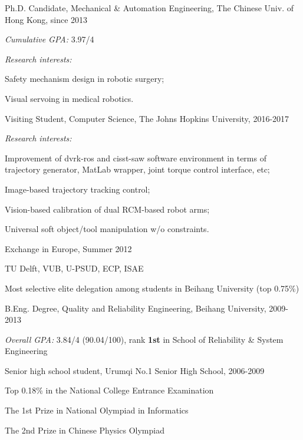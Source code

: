 \documentclass[10pt,letterpaper]{article}
\renewenvironment{itemize}{
\begin{list}{}{
    \setlength{\leftmargin}{1.5em}
    \setlength{\itemsep}{0.25em}
    \setlength{\parskip}{0pt}
    \setlength{\parsep}{0.25em}
    }
    }{
\end{list}
}
\begin{document}
\begin{itemize}
    \item Ph.D. Candidate, Mechanical \& Automation Engineering, The Chinese Univ. of Hong Kong, since 2013
    \begin{itemize}
        \item \emph{Cumulative GPA:} 3.97/4
        \item \emph{Research interests:}
        \begin{itemize}
            \item Safety mechanism design in robotic surgery;
            \item Visual servoing in medical robotics.
        \end{itemize}
        \end{itemize}
        \item Visiting Student, Computer Science, The Johns Hopkins University, 2016-2017
        \begin{itemize}
            \item \emph{Research interests:}
            \begin{itemize}
                \item Improvement of dvrk-ros and cisst-saw software environment in terms of trajectory generator, MatLab wrapper, joint torque control interface, etc;
                \item Image-based trajectory tracking control;
                \item Vision-based calibration of dual RCM-based robot arms;
                \item Universal soft object/tool manipulation w/o constraints.
            \end{itemize}
        \end{itemize}
        \item Exchange in Europe, Summer 2012
        \begin{itemize}
            \item TU Delft, VUB, U-PSUD, ECP, ISAE
            \item Most selective elite delegation among students in Beihang University (top 0.75\%)
        \end{itemize}
        \item B.Eng. Degree, Quality and Reliability Engineering, Beihang University, 2009-2013
        \begin{itemize}
            \item \emph{Overall GPA:} 3.84/4 (90.04/100), rank \textbf{1st} in School of Reliability \& System Engineering
        \end{itemize}
        \item Senior high school student, Urumqi No.1 Senior High School, 2006-2009
        \begin{itemize}
            \item Top 0.18\% in the National College Entrance Examination
            \item The 1st Prize in National Olympiad in Informatics
            \item The 2nd Prize in Chinese Physics Olympiad
        \end{itemize}
    \end{itemize}
\end{document}
